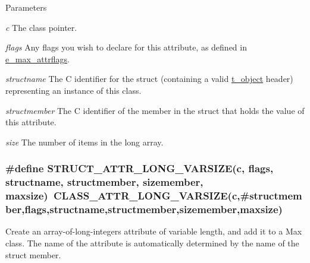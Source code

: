 \begin{DoxyParams}{Parameters}
\item[{\em c}]The class pointer. \item[{\em flags}]Any flags you wish to declare for this attribute, as defined in \hyperlink{group__attr_gaf296cfc6741bb19207f6ed8062809115}{e\_\-max\_\-attrflags}. \item[{\em structname}]The C identifier for the struct (containing a valid \hyperlink{structt__object}{t\_\-object} header) representing an instance of this class. \item[{\em structmember}]The C identifier of the member in the struct that holds the value of this attribute. \item[{\em size}]The number of items in the long array. \end{DoxyParams}
\hypertarget{group__attr_ga354af4c245f3d634a6ca655149e779e6}{
\subsubsection[{STRUCT\_\-ATTR\_\-LONG\_\-VARSIZE}]{\setlength{\rightskip}{0pt plus 5cm}\#define STRUCT\_\-ATTR\_\-LONG\_\-VARSIZE(c, \/  flags, \/  structname, \/  structmember, \/  sizemember, \/  maxsize)~CLASS\_\-ATTR\_\-LONG\_\-VARSIZE(c,\#structmember,flags,structname,structmember,sizemember,maxsize)}}
\label{group__attr_ga354af4c245f3d634a6ca655149e779e6}


Create an array-\/of-\/long-\/integers attribute of variable length, and add it to a Max class. The name of the attribute is automatically determined by the name of the struct member.


